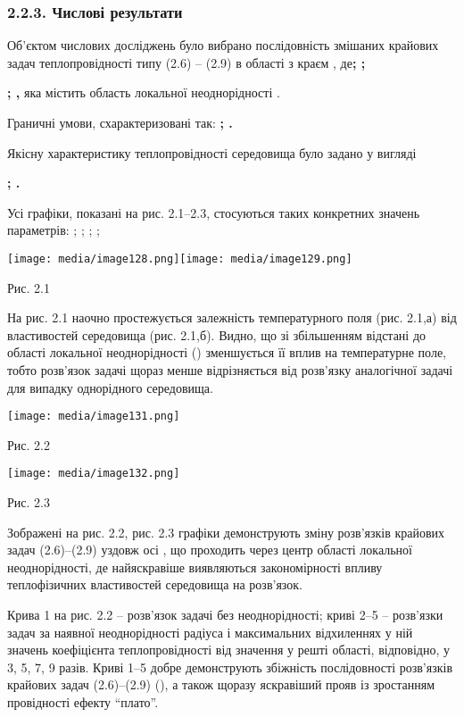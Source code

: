 \hypertarget{ux447ux438ux441ux43bux43eux432ux456-ux440ux435ux437ux443ux43bux44cux442ux430ux442ux438}{%
\subsubsection{2.2.3. Числові
результати}\label{ux447ux438ux441ux43bux43eux432ux456-ux440ux435ux437ux443ux43bux44cux442ux430ux442ux438}}

Об'єктом числових досліджень було вибрано послідовність змішаних
крайових задач теплопровідності типу (2.6) -- (2.9) в області з краєм ,
де\textbf{; ;}

\textbf{; ,} яка містить область локальної неоднорідності .

Граничні умови, схарактеризовані так: \textbf{; .}

Якісну характеристику теплопровідності середовища було задано у вигляді

\textbf{; .}

Усі графіки, показані на рис. 2.1--2.3, стосуються таких конкретних
значень параметрів: ; ; ; ;

\texttt{[image: media/image128.png]}\texttt{[image: media/image129.png]}

Рис. 2.1

На рис. 2.1 наочно простежується залежність температурного поля (рис.
2.1,а) від властивостей середовища (рис. 2.1,б). Видно, що зі
збільшенням відстані до області локальної неоднорідності () зменшується
її вплив на температурне поле, тобто розв'язок задачі щораз менше
відрізняється від розв'язку аналогічної задачі для випадку однорідного
середовища.

\texttt{[image: media/image131.png]}

Рис. 2.2

\texttt{[image: media/image132.png]}

Рис. 2.3

Зображені на рис. 2.2, рис. 2.3 графіки демонструють зміну розв'язків
крайових задач (2.6)--(2.9) уздовж осі , що проходить через центр
області локальної неоднорідності, де найяскравіше виявляються
закономірності впливу теплофізичних властивостей середовища на
розв'язок.

Крива 1 на рис. 2.2 -- розв'язок задачі без неоднорідності; криві 2--5
-- розв'язки задач за наявної неоднорідності радіуса і максимальних
відхиленнях у ній значень коефіцієнта теплопровідності від значення у
решті області, відповідно, у 3, 5, 7, 9 разів. Криві 1--5 добре
демонструють збіжність послідовності розв'язків крайових задач
(2.6)--(2.9) (), а також щоразу яскравіший прояв із зростанням
провідності ефекту ``плато''.

